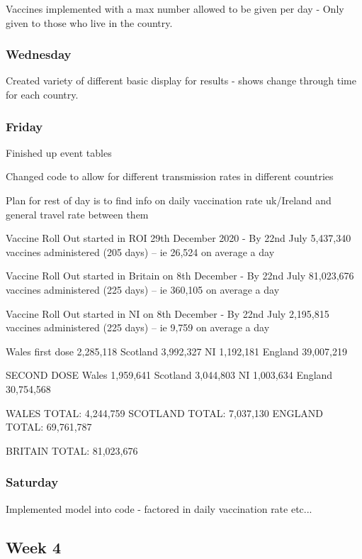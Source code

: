 \documentclass[a4paper,11pt]{article}
\theoremstyle{plain}
\theoremstyle{definition}
\begin{document}
Vaccines implemented with a max number allowed to be given per day - Only given to those who live in the country.

\subsubsection{Wednesday}

Created variety of different basic display for results - shows change through time for each country.

\subsubsection{Friday}

Finished up event tables

Changed code to allow for different transmission rates in different countries

Plan for rest of day is to find info on daily vaccination rate uk/Ireland and general travel rate between them

Vaccine Roll Out started in ROI 29th December 2020 - By 22nd July 5,437,340 vaccines administered (205 days) -- ie 26,524 on average a day

Vaccine Roll Out started in Britain on 8th December - By 22nd July 81,023,676 vaccines administered (225 days) -- ie 360,105 on average a day

Vaccine Roll Out started in NI on 8th December - By 22nd July 2,195,815 vaccines administered (225 days) -- ie 9,759 on average a day

Wales first dose 2,285,118
Scotland 3,992,327
NI 1,192,181
England 39,007,219

SECOND DOSE
Wales 1,959,641
Scotland 3,044,803
NI 1,003,634
England 30,754,568

WALES TOTAL: 4,244,759
SCOTLAND TOTAL: 7,037,130
ENGLAND TOTAL: 69,761,787

BRITAIN TOTAL: 81,023,676

\subsubsection{Saturday}

Implemented model into code - factored in daily vaccination rate etc...

\subsection{Week 4}
\end{document}
